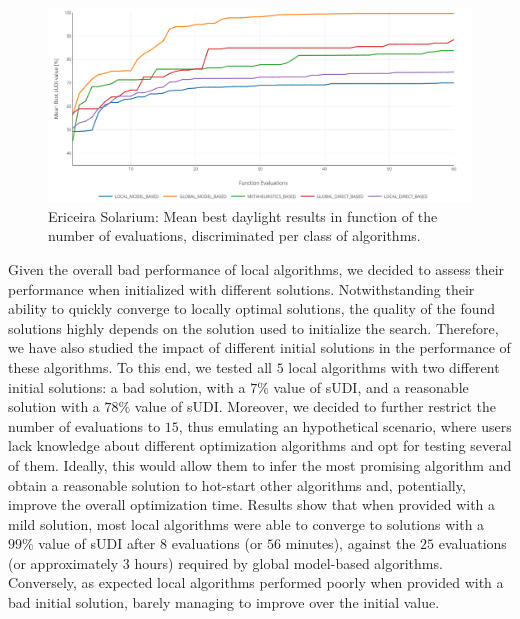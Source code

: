 \begin{figure}[]
	\centering
	\includegraphics[width=2\columnwidth]{../report/Images/Evaluation/Ericeira_results_ph1_per_class.PNG}
	\caption{Ericeira Solarium: Mean best daylight results in function of the number of evaluations, discriminated per class of algorithms.}
	\label{fig:phase1results}
\end{figure}

Given the overall bad performance of local algorithms, we decided to assess their performance when initialized with different solutions. Notwithstanding their ability to quickly converge to locally optimal solutions, the quality of the found solutions highly depends on the solution used to initialize the search. Therefore, we have also studied the impact of different initial solutions in the performance of these algorithms. To this end, we tested all $5$ local algorithms with two different initial solutions: a bad solution, with a $7\%$ value of \ac{sUDI}, and a reasonable solution with a $78\%$ value of \ac{sUDI}. Moreover, we decided to further restrict the number of evaluations to $15$, thus emulating an hypothetical scenario, where users lack knowledge about different optimization algorithms and opt for testing several of them. Ideally, this would allow them to infer the most promising algorithm and obtain a reasonable solution to hot-start other algorithms and, potentially, improve the overall optimization time. Results show that when provided with a mild solution, most local algorithms were able to converge to solutions with a $99\%$ value of \ac{sUDI} after $8$ evaluations (or $56$ minutes), against the $25$ evaluations (or approximately $3$ hours) required by global model-based algorithms. Conversely, as expected local algorithms performed poorly when provided with a bad initial solution, barely managing to improve over the initial value.

